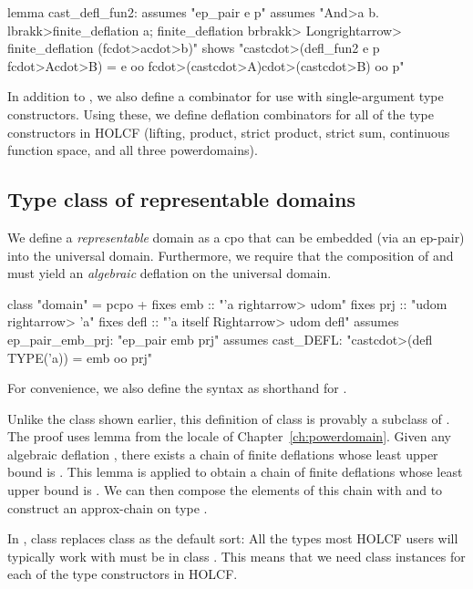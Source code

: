 \begin{isacode}
lemma cast_defl_fun2:
  assumes "ep_pair e p"
  assumes
    "\<And>a b. \<lbrakk>finite_deflation a; finite_deflation b\<rbrakk> \<Longrightarrow> finite_deflation (f\<cdot>a\<cdot>b)"
  shows "cast\<cdot>(defl_fun2 e p f\<cdot>A\<cdot>B) = e oo f\<cdot>(cast\<cdot>A)\<cdot>(cast\<cdot>B) oo p"
\end{isacode}

In addition to , we also define a combinator  for use with single-argument type constructors. Using these, we define deflation combinators for all of the type constructors in HOLCF (lifting, product, strict product, strict sum, continuous function space, and all three powerdomains).

\subsection{Type class of representable domains}
\label{sec:universal-representable}

We define a \emph{representable} domain as a cpo that can be embedded (via an ep-pair) into the universal domain. Furthermore, we require that the composition of  and  must yield an \emph{algebraic} deflation on the universal domain.
%
\begin{isacode}
class "domain" = pcpo +
  fixes emb :: "'a \<rightarrow> udom"
  fixes prj :: "udom \<rightarrow> 'a"
  fixes defl :: "'a itself \<Rightarrow> udom defl"
  assumes ep_pair_emb_prj: "ep_pair emb prj"
  assumes cast_DEFL: "cast\<cdot>(defl TYPE('a)) = emb oo prj"
\end{isacode}
%
For convenience, we also define the syntax  as shorthand for .

Unlike the class  shown earlier, this definition of class  is provably a subclass of . The proof uses lemma  from the  locale of Chapter~\ref{ch:powerdomain}. Given any algebraic deflation , there exists a chain of finite deflations whose least upper bound is . This lemma is applied to obtain a chain of finite deflations whose least upper bound is . We can then compose the elements of this chain with  and  to construct an approx-chain on type .

In , class  replaces class  as the default sort: All the types most HOLCF users will typically work with must be in class . This means that we need class instances for each of the type constructors in HOLCF. 

